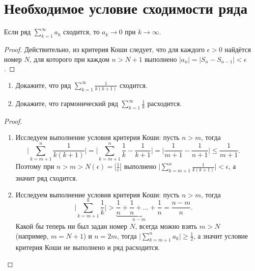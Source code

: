 	\section{Необходимое условие сходимости ряда}
	
	\begin{corollary}
		Если ряд $\sum_{k = 1}^{\infty}	a_k$ сходится, то $a_k \rightarrow 0$ при $k \rightarrow \infty.$
	\end{corollary}
	
	\begin{proof}
		Действительно, из критерия Коши следует, что для каждого $\epsilon > 0$ найдётся номер $N$, для которого при каждом $n > N + 1$ выполнено $|a_n| = |S_n - S_{n - 1}| < \epsilon$.
	\end{proof}
	
	\begin{example}
		\begin{enumerate}
			\item Докажите, что ряд $\sum^{\infty}_{k = 1} \frac{1}{k(k + 1)}$ сходится.
			\item Докажите, что гармонический ряд $\sum^{\infty}_{k = 1} \frac{1}{k}$ расходится.
		\end{enumerate}
	\end{example}
	
	\begin{proof}
		\begin{enumerate}
			\item Исследуем выполнение условия критерия Коши: пусть $n > m$, тогда
			\[ \bigg|\sum_{k = m + 1}^n \frac{1}{k(k + 1)}\bigg| = \bigg|\sum_{k = m + 1}^n \frac{1}{k} - \frac{1}{k + 1}\bigg| = \bigg|\frac{1}{m + 1} - \frac{1}{n + 1}\bigg| \leqslant \frac{1}{m + 1}. \]
			Поэтому при $n > m > N(\epsilon) = \big[\frac{1}{\epsilon}\big]$ выполнено $\displaystyle \bigg|\sum_{k = m + 1}^n \frac{1}{k(k + 1)}\bigg| < \epsilon$, а значит ряд сходится.
			\item Исследуем выполнение условия критерия Коши: пусть $n > m$, тогда \[ \bigg|\sum_{k = m + 1}^n \frac{1}{k}\bigg| > \underbrace{\frac{1}{n} + \frac{1}{n} + ... + \frac{1}{n}}_{n - m} = \frac{n - m}{n}. \]
			Какой бы теперь ни был задан номер $N$, всегда можно взять $m > N$ (например, $m = N + 1$) и $n = 2m$, тогда $\displaystyle \bigg|\sum_{k = m + 1}^n a_k\bigg| \geqslant \frac{1}{2}$, а значит условие критерия Коши не выполнено и ряд расходится.
		\end{enumerate}
	\end{proof}
	
